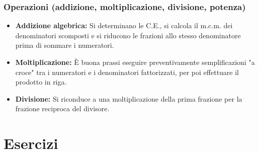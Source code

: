 \subsubsection{Operazioni (addizione, moltiplicazione, divisione, potenza)}
\begin{itemize}
    \item \textbf{Addizione algebrica:} Si determinano le C.E., si calcola il m.c.m. dei denominatori scomposti e si riducono le frazioni allo stesso denominatore prima di sommare i numeratori.
    \item \textbf{Moltiplicazione:} È buona prassi eseguire preventivamente semplificazioni "a croce" tra i numeratori e i denominatori fattorizzati, per poi effettuare il prodotto in riga.
    \item \textbf{Divisione:} Si riconduce a una moltiplicazione della prima frazione per la frazione reciproca del divisore.
\end{itemize}


\section{Esercizi}


